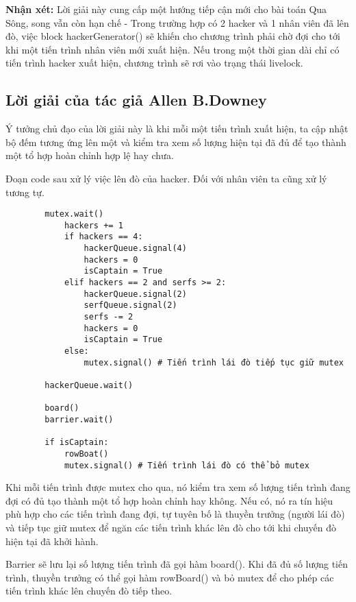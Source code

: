 \documentclass[a4paper]{article}
\begin{document}
	\textbf{Nhận xét: } Lời giải này cung cấp một hướng tiếp cận mới cho bài toán Qua Sông,
	song vẫn còn hạn chế - Trong trường hợp có 2 hacker và 1 nhân viên đã lên đò, việc block
	hackerGenerator() sẽ khiến cho chương trình phải chờ đợi cho tới khi một tiến trình nhân 
	viên mới xuất hiện. Nếu trong một thời gian dài chỉ có tiến trình hacker xuất hiện, chương
	trình sẽ rơi vào trạng thái livelock. 

	\subsection{Lời giải của tác giả Allen B.Downey}
	Ý tưởng chủ đạo của lời giải này là khi mỗi một tiến trình xuất hiện, ta cập nhật bộ đếm 
	tương ứng lên một và kiểm tra xem số lượng hiện tại đã đủ để tạo thành một tổ hợp hoàn chỉnh
	hợp lệ hay chưa.

	Đoạn code sau xử lý việc lên đò của hacker. Đối với nhân viên ta cũng xử lý tương tự.

	\begin{tcolorbox}
	\begin{verbatim}
		mutex.wait()
		    hackers += 1
		    if hackers == 4: 
		        hackerQueue.signal(4)
		        hackers = 0 
		        isCaptain = True 
		    elif hackers == 2 and serfs >= 2: 
		        hackerQueue.signal(2) 
		        serfQueue.signal(2) 
		        serfs -= 2 
		        hackers = 0 
		        isCaptain = True 
		    else:
		        mutex.signal() # Tiến trình lái đò tiếp tục giữ mutex 
		
		hackerQueue.wait() 
		
		board() 
		barrier.wait() 
		
		if isCaptain: 
		    rowBoat() 
		    mutex.signal() # Tiến trình lái đò có thể bỏ mutex 
	\end{verbatim}
	\end{tcolorbox}
	
	Khi mỗi tiến trình được mutex cho qua, nó kiểm tra xem số lượng tiến
	trình đang đợi có đủ tạo thành một tổ hợp hoàn chỉnh hay không. Nếu có, 
	nó ra tín hiệu phù hợp cho các tiến trình đang đợi, tự tuyên bố là 
	thuyền trưởng (người lái đò) và tiếp tục giữ mutex để ngăn các tiến trình
	khác lên đò cho tới khi chuyến đò hiện tại đã khởi hành.

	Barrier sẽ lưu lại số lượng tiến trình đã gọi hàm board(). Khi đã đủ số
	lượng tiến trình, thuyền trưởng có thể gọi hàm rowBoard() và bỏ mutex để
	cho phép các tiến trình khác lên chuyến đò tiếp theo.
	
	
	
\end{document}
